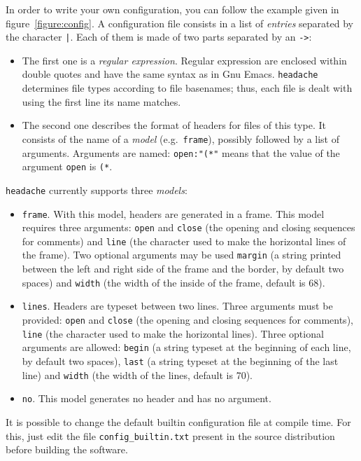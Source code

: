 \documentclass{article}
\newcommand{\mytt}[1]{\texttt{#1}}
\newcommand{\headache}{\mytt{headache}}
\begin{document}
In order to write your own configuration, you can follow the example
given in figure~\ref{figure:config}.  A configuration file consists in
a list of \emph{entries} separated by the character \mytt{|}.  Each
of them is made of two parts separated by an \mytt{->}:
\begin{itemize}
\item The first one is a \emph{regular expression}.  Regular
  expression are enclosed within double quotes and have the same
  syntax as in Gnu Emacs.  \headache{} determines file types according to
  file basenames; thus, each file is dealt with using the first line
  its name matches.
\item The second one describes the format of headers for files of this
  type.  It consists of the name of a \emph{model} (e.g.\ 
  \mytt{frame}), possibly followed by a list of arguments.  Arguments
  are named: \mytt{open:"(*"} means that the value of the argument
  \mytt{open} is \mytt{(*}.
\end{itemize}
\headache{} currently supports three \emph{models}:
\begin{itemize}
\item \mytt{frame}.  With this model, headers are generated in a
  frame.  This model requires three arguments: \mytt{open} and
  \mytt{close} (the opening and closing sequences for comments) and
  \mytt{line} (the character used to make the horizontal lines of the
  frame).  Two optional arguments may be used \mytt{margin} (a string
  printed between the left and right side of the frame and the border,
  by default two spaces) and \mytt{width} (the width of the inside of
  the frame, default is 68).
\item \mytt{lines}.  Headers are typeset between two lines.  Three
  arguments must be provided: \mytt{open} and \mytt{close} (the
  opening and closing sequences for comments), \mytt{line} (the
  character used to make the horizontal lines).  Three optional
  arguments are allowed: \mytt{begin} (a string typeset at the
  beginning of each line, by default two spaces), \mytt{last} (a
  string typeset at the beginning of the last line) and \mytt{width}
  (the width of the lines, default is 70).
\item \mytt{no}.  This model generates no header and has no argument.
\end{itemize}


It is possible to change the default builtin configuration file at
compile time.  For this, just edit the file \mytt{config\_builtin.txt}
present in the source distribution before building the software.
\end{document}

